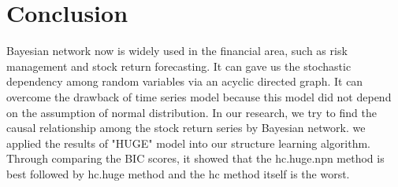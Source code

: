 \documentclass[12pt]{article}
\theoremstyle{plain}
\begin{document}
\section{Conclusion}
Bayesian network now is widely used in the financial area, such as risk management and stock return forecasting. It can gave us the stochastic dependency among random variables via an acyclic directed graph. It can overcome the drawback of time series model because this model did not depend on the assumption of normal distribution. In our research, we try to find the causal relationship among the stock return series by Bayesian network. we applied the results of "HUGE" model into our structure learning algorithm. Through comparing the BIC scores, it showed that the hc.huge.npn method is best followed by hc.huge method and the hc method itself is the worst.
\end{document}

